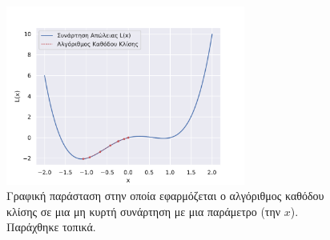 \begin{figure}[h]
  \centering
  \includegraphics[width=0.7\textwidth]{images/chapter theoritical background/gd_init_at_plus0point1.pdf}
  \caption{Γραφική παράσταση στην οποία εφαρμόζεται ο αλγόριθμος καθόδου κλίσης σε μια μη κυρτή συνάρτηση με μια παράμετρο (την $x$).  Παράχθηκε τοπικά. }
  \label{fig:_gd01}
\end{figure}

